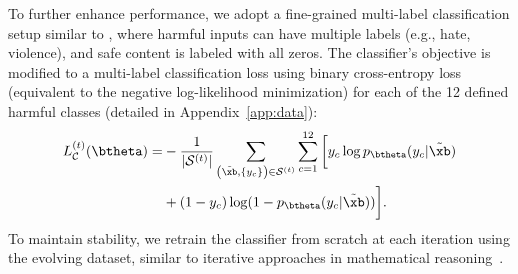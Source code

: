 To further enhance performance, we adopt a fine-grained multi-label classification setup similar to \citet{dubey2024llama}, where harmful inputs can have multiple labels (e.g., hate, violence), and safe content is labeled with all zeros. The classifier’s objective is modified to a multi-label classification loss using binary cross-entropy loss (equivalent to the negative log-likelihood minimization) for each of the 12 defined harmful classes (detailed in Appendix~\ref{app:data}): \vspace{-1mm}
\begin{align}
L^{(t)}_{\mathcal{C}}(\btheta) = &- \frac{1}{|\mathcal{S}^{(t)}|} \sum_{\left(\tilde{\xb},\{y_c\}\right) \in \mathcal{S}^{(t)}} \sum_{c=1}^{12} \bigg[y_c \log p_{\btheta}(y_c | \tilde{\xb}) \nonumber \\
&+ (1 - y_{c}) \log (1 - p_{\btheta}(y_{c} | \tilde{\xb})) \bigg]. \label{eq:entropy_loss}
\end{align}
To maintain stability, we retrain the classifier from scratch at each iteration using the evolving dataset, similar to iterative approaches in mathematical reasoning~\citep{hosseini2024v}.

